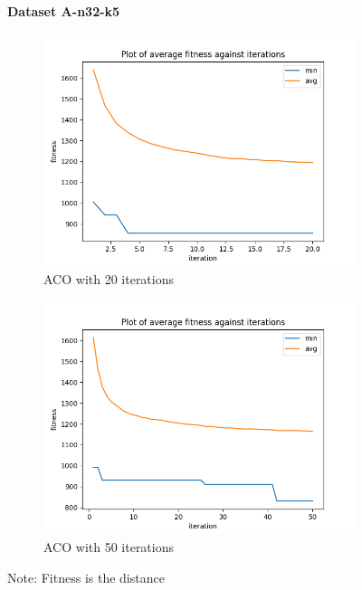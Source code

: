 \documentclass{article}
\begin{document}
\begin{figure}[H]
  \centering
  \textbf{Dataset A-n32-k5}
  \begin{subfigure}{.5\textwidth}
    \centering
    \includegraphics[width=1\linewidth]{images/n32-k5_20.png}
    \caption{ACO with 20 iterations}
    \label{fig:n32-k5_20}
  \end{subfigure}%
  \begin{subfigure}{.5\textwidth}
    \centering
    \includegraphics[width=1\linewidth]{images/n32-k5_50.png}
    \caption{ACO with 50 iterations}
    \label{fig:n32-k5_50}
  \end{subfigure}
  \caption{Note: Fitness is the distance}
  \label{fig:n32-k5}
\end{figure}
\end{document}
